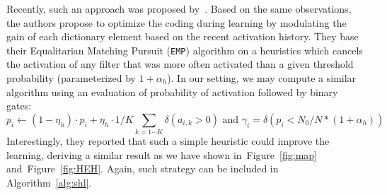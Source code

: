 \documentclass[draft]{article} %
\newcommand{\seeFig}[1]{Figure~\ref{fig:#1}}%
\begin{document}
Recently, such an approach was proposed by~\citet{Sandin17}. Based on the same observations, the authors propose to optimize the coding during learning by modulating the gain of each dictionary element based on the recent activation history. They base their Equalitarian Matching Pursuit (\texttt{EMP}) algorithm on a heuristics which cancels the activation of any filter that was more often activated than a given threshold probability (parameterized by $1+\alpha_h$). In our setting, we may compute a similar algorithm using an evaluation of probability of activation followed by binary gates:
\begin{equation}%
p_i \leftarrow (1- \eta_h ) \cdot p_i + \eta_h \cdot 1/K\sum_{k=1\cdots K} \delta(a_{i, k} > 0) \textrm{ and }
\gamma_i = \delta (p_i < N_0/N*(1+\alpha_h) )
\end{equation}%
Interestingly, they reported that such a simple heuristic could improve the learning, deriving a similar result as we have shown in~\seeFig{map} and~\seeFig{HEH}. %
Again, such strategy can be included in Algorithm~\ref{alg:shl}.
\end{document}
